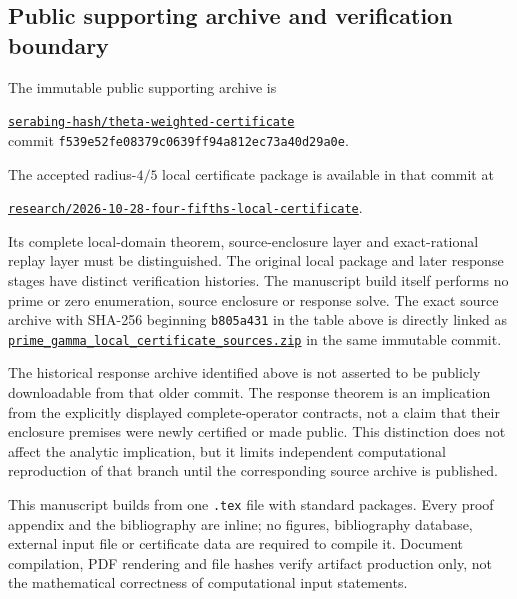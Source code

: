 \documentclass[11pt,a4paper]{article}
\numberwithin{equation}{section}
\theoremstyle{definition}\newtheorem{definition}[theorem]{Definition}
\theoremstyle{remark}\newtheorem{remark}[theorem]{Remark}
\begin{document}
\subsection{Public supporting archive and verification boundary}
The immutable public supporting archive is
\begin{center}\small
\href{https://github.com/serabing-hash/theta-weighted-certificate/tree/f539e52fe08379c0639ff94a812ec73a40d29a0e}{\texttt{serabing-hash/theta-weighted-certificate}}\\
commit \nolinkurl{f539e52fe08379c0639ff94a812ec73a40d29a0e}.
\end{center}
The accepted radius-$4/5$ local certificate package is available in that commit at
\begin{center}\small
\href{https://github.com/serabing-hash/theta-weighted-certificate/tree/f539e52fe08379c0639ff94a812ec73a40d29a0e/research/2026-10-28-four-fifths-local-certificate}{\texttt{research/2026-10-28-four-fifths-local-certificate}}.
\end{center}
Its complete local-domain theorem, source-enclosure layer and exact-rational replay layer must be distinguished. The original local package and later response stages have distinct verification histories. The manuscript build itself performs no prime or zero enumeration, source enclosure or response solve.
The exact source archive with SHA-256 beginning \texttt{b805a431} in the table above is directly linked as
\href{https://github.com/serabing-hash/theta-weighted-certificate/blob/f539e52fe08379c0639ff94a812ec73a40d29a0e/research/2026-10-28-four-fifths-local-certificate/prime_gamma_local_certificate_sources.zip}{\texttt{prime\_gamma\_local\_certificate\_sources.zip}} in the same immutable commit.

The historical response archive identified above is not asserted to be publicly downloadable from that older commit. The response theorem is an implication from the explicitly displayed complete-operator contracts, not a claim that their enclosure premises were newly certified or made public. This distinction does not affect the analytic implication, but it limits independent computational reproduction of that branch until the corresponding source archive is published.

This manuscript builds from one \texttt{.tex} file with standard packages. Every proof appendix and the bibliography are inline; no figures, bibliography database, external input file or certificate data are required to compile it. Document compilation, PDF rendering and file hashes verify artifact production only, not the mathematical correctness of computational input statements.
\end{document}
